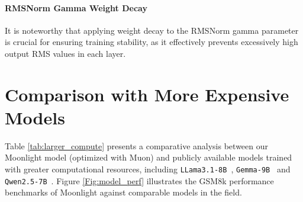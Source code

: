 \paragraph{RMSNorm Gamma Weight Decay} It is noteworthy that applying weight decay to the RMSNorm gamma parameter is crucial for ensuring training stability, as it effectively prevents excessively high output RMS values in each layer.


\section{Comparison with More Expensive Models}
\label{sec:appendix:comparisons}


Table \ref{tab:larger_compute} presents a comparative analysis between our Moonlight model (optimized with Muon) and publicly available models trained with greater computational resources, including \texttt{LLama3.1-8B}~\citep{grattafiori2024llama3herdmodels}, \texttt{Gemma-9B}~\citep{team2024gemma} and \texttt{Qwen2.5-7B}~\citep{qwen2.5}. Figure \ref{Fig:model_perf} illustrates the GSM8k performance benchmarks of Moonlight against comparable models in the field.

